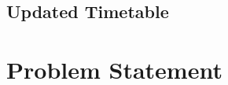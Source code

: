 \documentclass{article}
\begin{document}
	\subsection{Updated Timetable}
	
	
	
	
	
	
	
	\newpage
	
	\appendix
	\appendixpage
	\addappheadtotoc
	

	\section{Problem Statement}
	
\end{document}
